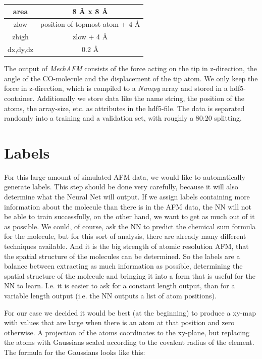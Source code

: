\documentclass{article}
\begin{document}
\begin{center}
\begin{tabular}{|c|c|}
\hline area & 8 {\AA} x 8 {\AA} \\ 
\hline zlow & position of topmost atom + 4 {\AA} \\ 
\hline zhigh & zlow + 4 {\AA} \\ 
\hline dx,dy,dz & 0.2 {\AA} \\ 
\hline 
\end{tabular} 
\end{center}

The output of \emph{MechAFM} consists of the force acting on the tip in z-direction, the angle of the CO-molecule and the displacement of the tip atom. We only keep the force in z-direction, which is compiled to a \emph{Numpy} array and stored in a hdf5-container. Additionally we store data like the name string, the position of the atoms, the array-size, etc. as attributes in the hdf5-file. The data is separated randomly into a training and a validation set, with roughly a 80:20 splitting.


\newpage

\section{Labels}
For this large amount of simulated AFM data, we would like to automatically generate labels. This step should be done very carefully, because it will also determine what the Neural Net will output. If we assign labels containing more information about the molecule than there is in the AFM data, the NN will not be able to train successfully, on the other hand, we want to get as much out of it as possible. We could, of course, ask the NN to predict the chemical sum formula for the molecule, but for this sort of analysis, there are already many different techniques available. And it is the big strength of atomic resolution AFM, that the spatial structure of the molecules can be determined. So the labels are a balance between extracting as much information as possible, determining the spatial structure of the molecule and bringing it into a form that is useful for the NN to learn. I.e. it is easier to ask for a constant length output, than for a variable length output (i.e. the NN outputs a list of atom positions).

For our case we decided it would be best (at the beginning) to produce a xy-map with values that are large when there is an atom at that position and zero otherwise. A projection of the atoms coordinates to the xy-plane, but replacing the atoms with Gaussians scaled according to the covalent radius of the element. The formula for the Gaussians looks like this:
\end{document}
